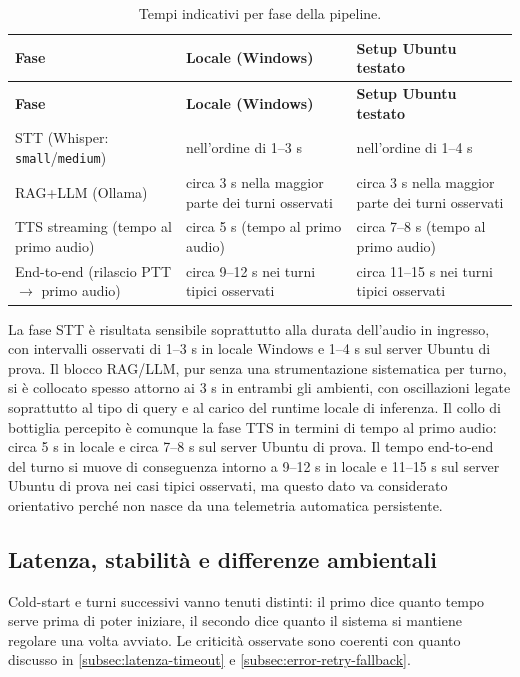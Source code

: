 \par\begingroup
\small
\setlength{\LTleft}{0pt}
\setlength{\LTright}{0pt}
\begin{longtable}{|>{\raggedright\arraybackslash}p{}|>{\raggedright\arraybackslash}p{}|>{\raggedright\arraybackslash}p{}|}
\caption[Tempi per fase della pipeline]{Tempi indicativi per fase della pipeline.}
\label{tab:tempi-fase} \\
\hline
\textbf{Fase} & \textbf{Locale (Windows)} & \textbf{Setup Ubuntu testato} \\
\hline
\endfirsthead
\hline
\textbf{Fase} & \textbf{Locale (Windows)} & \textbf{Setup Ubuntu testato} \\
\hline
\endhead
STT (Whisper: \texttt{small}/\texttt{medium}) & nell'ordine di 1--3 s & nell'ordine di 1--4 s \\
\hline
RAG+LLM (Ollama) & circa 3 s nella maggior parte dei turni osservati & circa 3 s nella maggior parte dei turni osservati \\
\hline
TTS streaming (tempo al primo audio) & circa 5 s (tempo al primo audio) & circa 7--8 s (tempo al primo audio) \\
\hline
End-to-end (rilascio PTT $\rightarrow$ primo audio) & circa 9--12 s nei turni tipici osservati & circa 11--15 s nei turni tipici osservati \\
\hline
\end{longtable}
\par\endgroup

La fase STT è risultata sensibile soprattutto alla durata dell'audio in ingresso, con intervalli osservati di 1--3 s in locale Windows e 1--4 s sul server Ubuntu di prova. Il blocco RAG/LLM, pur senza una strumentazione sistematica per turno, si è collocato spesso attorno ai 3 s in entrambi gli ambienti, con oscillazioni legate soprattutto al tipo di query e al carico del runtime locale di inferenza. Il collo di bottiglia percepito è comunque la fase TTS in termini di tempo al primo audio: circa 5 s in locale e circa 7--8 s sul server Ubuntu di prova. Il tempo end-to-end del turno si muove di conseguenza intorno a 9--12 s in locale e 11--15 s sul server Ubuntu di prova nei casi tipici osservati, ma questo dato va considerato orientativo perché non nasce da una telemetria automatica persistente.

\subsection{Latenza, stabilità e differenze ambientali}
Cold-start e turni successivi vanno tenuti distinti: il primo dice quanto tempo serve prima di poter iniziare, il secondo dice quanto il sistema si mantiene regolare una volta avviato. Le criticità osservate sono coerenti con quanto discusso in \autoref{subsec:latenza-timeout} e \autoref{subsec:error-retry-fallback}.

